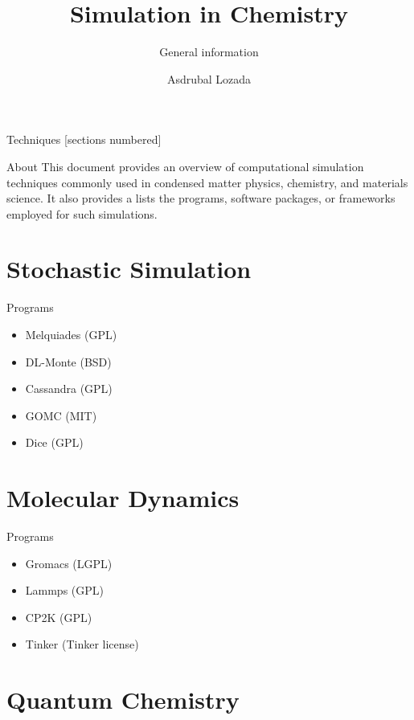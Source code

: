 \documentclass[10pt]{beamer}
\title{Simulation in Chemistry}
\subtitle{General information}
\date{}
\author{Asdrubal Lozada}
\begin{document}
\maketitle

\begin{frame}{Techniques}
  [sections numbered]
  \tableofcontents%
\end{frame}

\begin{frame}[frame]{About}
    This document provides an overview of computational simulation techniques commonly used in condensed matter physics, chemistry, and materials science. It also provides a lists the programs, software packages, or frameworks employed for such simulations.
\end{frame}

\section[Stochastic]{Stochastic Simulation}

\begin{frame}[fragile]{Programs}

  \begin{itemize}
      \item Melquiades (GPL)
      \item DL-Monte (BSD)
      \item Cassandra (GPL)
      \item GOMC (MIT)
      \item Dice (GPL)
  \end{itemize}
\end{frame}

\section[Dynamics]{Molecular Dynamics}

\begin{frame}[fragile]{Programs}
	\begin{itemize}
	    \item Gromacs (LGPL)
        \item Lammps (GPL)
        \item CP2K (GPL)
        \item Tinker (Tinker license)
    \end{itemize}
\end{frame}

\section[Quantum]{Quantum Chemistry}
\end{document}
